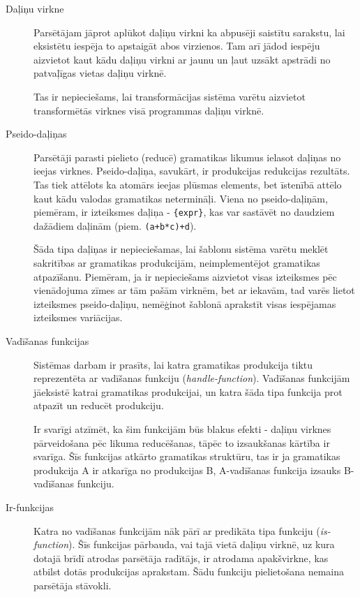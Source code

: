 \begin{description}
\item[Daļiņu virkne]
Parsētājam jāprot aplūkot daļiņu virkni ka abpusēji saistītu sarakstu, lai eksistētu iespēja to apstaigāt abos virzienos. Tam arī jādod iespēju aizvietot kaut kādu daļiņu virkni ar jaunu un ļaut uzsākt apstrādi no patvaļīgas vietas daļiņu virknē.

Tas ir nepieciešams, lai transformācijas sistēma varētu aizvietot transformētās virknes visā programmas daļiņu virknē.

\item[Pseido-daļiņas]
Parsētāji parasti pielieto (reducē) gramatikas likumus ielasot daļiņas no ieejas virknes. Pseido-daļiņa, savukārt, ir produkcijas redukcijas rezultāts. Tas tiek attēlots ka atomārs ieejas plūsmas elements, bet īstenībā attēlo kaut kādu valodas gramatikas netermināļi. Viena no pseido-daļiņām, piemēram, ir izteiksmes daļiņa - \verb|{expr}|, kas var sastāvēt no daudziem dažādiem daļinām (piem. \verb|(a+b*c)+d|).

Šāda tipa daļiņas ir nepieciešamas, lai šablonu sistēma varētu meklēt sakritības ar gramatikas produkcijām, neimplementējot gramatikas atpazīšanu. Piemēram, ja ir nepieciešams aizvietot visas izteiksmes pēc vienādojuma zīmes ar tām pašām virknēm, bet ar iekavām, tad varēs lietot izteiksmes pseido-daļiņu, nemēģinot šablonā aprakstīt visas iespējamas izteiksmes variācijas.

\item[Vadīšanas funkcijas]
Sistēmas darbam ir prasīts, lai katra gramatikas produkcija tiktu reprezentēta ar vadīšanas funkciju (\emph{handle-function}). Vadīšanas funkcijām jāeksistē katrai gramatikas produkcijai, un katra šāda tipa funkcija prot atpazīt un reducēt produkciju.

Ir svarīgi atzīmēt, ka šim funkcijām būs blakus efekti - daļiņu virknes pārveidošana pēc likuma reducēšanas, tāpēc to izsaukšanas kārtība ir svarīga. Šīs funkcijas atkārto gramatikas struktūru, tas ir ja gramatikas produkcija A ir atkarīga no produkcijas B, A-vadīšanas funkcija izsauks B-vadīšanas funkciju.

\item[Ir-funkcijas]
Katra no vadīšanas funkcijām nāk pārī ar predikāta tipa funkciju (\emph{is-function}). Šīs funkcijas pārbauda, vai tajā vietā daļiņu virknē, uz kura dotajā brīdī atrodas parsētāja radītājs, ir atrodama apakšvirkne, kas atbilst dotās produkcijas aprakstam. Šādu funkciju pielietošana nemaina parsētāja stāvokli.


\end{description}
